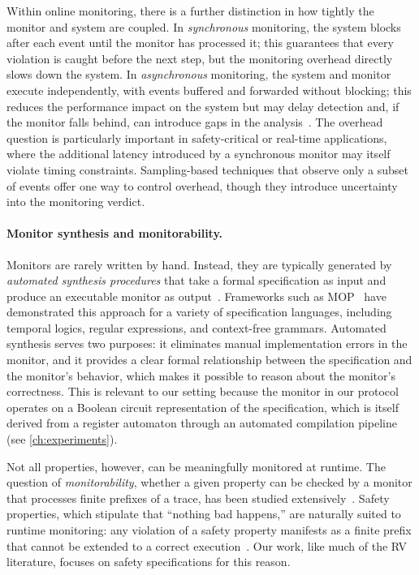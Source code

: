 Within online monitoring, there is a further distinction in how tightly the monitor and system are coupled.
In \emph{synchronous} monitoring, the system blocks after each event until the monitor has processed it; this guarantees that every violation is caught before the next step, but the monitoring overhead directly slows down the system.
In \emph{asynchronous} monitoring, the system and monitor execute independently, with events buffered and forwarded without blocking; this reduces the performance impact on the system but may delay detection and, if the monitor falls behind, can introduce gaps in the analysis~\cite{BFFR18}.
The overhead question is particularly important in safety-critical or real-time applications, where the additional latency introduced by a synchronous monitor may itself violate timing constraints.
Sampling-based techniques that observe only a subset of events offer one way to control overhead, though they introduce uncertainty into the monitoring verdict.

\paragraph{Monitor synthesis and monitorability.}
Monitors are rarely written by hand.
Instead, they are typically generated by \emph{automated synthesis procedures} that take a formal specification as input and produce an executable monitor as output~\cite{BFFR18}.
Frameworks such as MOP~\cite{CR07} have demonstrated this approach for a variety of specification languages, including temporal logics, regular expressions, and context-free grammars.
Automated synthesis serves two purposes: it eliminates manual implementation errors in the monitor, and it provides a clear formal relationship between the specification and the monitor's behavior, which makes it possible to reason about the monitor's correctness.
This is relevant to our setting because the monitor in our protocol operates on a Boolean circuit representation of the specification, which is itself derived from a register automaton through an automated compilation pipeline (see \cref{ch:experiments}).

Not all properties, however, can be meaningfully monitored at runtime.
The question of \emph{monitorability}, whether a given property can be checked by a monitor that processes finite prefixes of a trace, has been studied extensively~\cite{PZ06,BLS07}.
Safety properties, which stipulate that ``nothing bad happens,'' are naturally suited to runtime monitoring: any violation of a safety property manifests as a finite prefix that cannot be extended to a correct execution~\cite{KKLSV02}.
Our work, like much of the RV literature, focuses on safety specifications for this reason.

